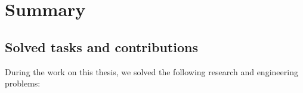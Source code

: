 \chapter{Summary}
\label{ch:summary}


\section{Solved tasks and contributions}

During the work on this thesis, we solved the following research and engineering problems:


